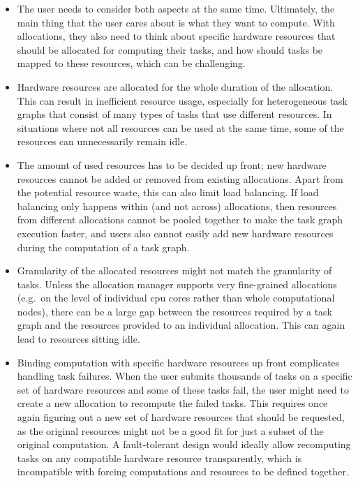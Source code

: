 \begin{itemize}
	\item The user needs to consider both aspects at the same time. Ultimately, the main thing that the user
	      cares about is what they want to compute. With allocations, they also need to think about specific
	      hardware resources that should be allocated for computing their tasks, and how should tasks be
	      mapped to these resources, which can be challenging.
	\item Hardware resources are allocated for the whole duration of the allocation. This can result in
	      inefficient resource usage, especially for heterogeneous task graphs that consist of many types of
	      tasks that use different resources. In situations where not all resources can be used at the same
	      time, some of the resources can unnecessarily remain idle.
	\item The amount of used resources has to be decided up front; new hardware resources cannot be added or
	      removed from existing allocations. Apart from the potential resource waste, this can also limit
	      load balancing. If load balancing only happens within (and not across) allocations, then resources
	      from different allocations cannot be pooled together to make the task graph execution faster, and
	      users also cannot easily add new hardware resources during the computation of a task graph.
	\item Granularity of the allocated resources might not match the granularity of tasks. Unless the
	      allocation manager supports very fine-grained allocations (e.g.\ on the level of individual
	      \gls{cpu} cores rather than whole computational nodes), there can be a large gap
	      between the resources required by a task graph and the resources provided to an individual
	      allocation. This can again lead to resources sitting idle.
	\item Binding computation with specific hardware resources up front complicates handling task failures.
	      When the user submits thousands of tasks on a specific set of hardware resources and some of these
	      tasks fail, the user might need to create a new allocation to recompute the failed tasks. This
	      requires once again figuring out a new set of hardware resources that should be requested, as the
	      original resources might not be a good fit for just a subset of the original computation. A
	      fault-tolerant design would ideally allow recomputing tasks on any compatible hardware resource
	      transparently, which is incompatible with forcing computations and resources to be defined
	      together.
\end{itemize}

